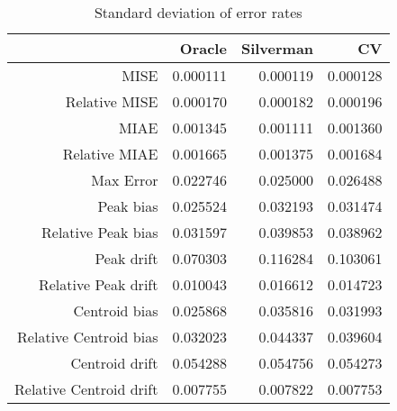 \begin{table}[ht]
\centering
\begin{tabular}{rrrr}
  \hline
 & Oracle & Silverman & CV \\ 
  \hline
MISE & 0.000111 & 0.000119 & 0.000128 \\ 
  Relative MISE & 0.000170 & 0.000182 & 0.000196 \\ 
  MIAE & 0.001345 & 0.001111 & 0.001360 \\ 
  Relative MIAE & 0.001665 & 0.001375 & 0.001684 \\ 
  Max Error & 0.022746 & 0.025000 & 0.026488 \\ 
  Peak bias & 0.025524 & 0.032193 & 0.031474 \\ 
  Relative Peak bias & 0.031597 & 0.039853 & 0.038962 \\ 
  Peak drift & 0.070303 & 0.116284 & 0.103061 \\ 
  Relative Peak drift & 0.010043 & 0.016612 & 0.014723 \\ 
  Centroid bias & 0.025868 & 0.035816 & 0.031993 \\ 
  Relative Centroid bias & 0.032023 & 0.044337 & 0.039604 \\ 
  Centroid drift & 0.054288 & 0.054756 & 0.054273 \\ 
  Relative Centroid drift & 0.007755 & 0.007822 & 0.007753 \\ 
   \hline
\end{tabular}
\caption{Standard deviation of error rates} 
\label{tbl:stddev_error_rates}
\end{table}
